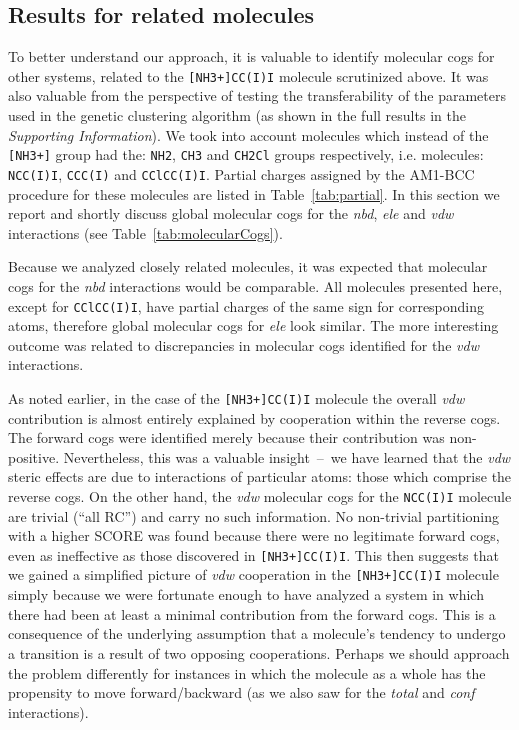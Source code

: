 {\color{black}
\subsection*{Results for related molecules}
To better understand our approach, it is valuable to identify molecular cogs for other systems, related to the \texttt{[NH3+]CC(I)I} molecule scrutinized above.
It was also valuable from the perspective of testing the transferability of the parameters used in the genetic clustering algorithm (as shown in the full results in the \emph{Supporting Information}).
We took into account molecules which instead of the \texttt{[NH3+]} group had the: \texttt{NH2}, \texttt{CH3} and \texttt{CH2Cl} groups respectively, i.e. molecules: \texttt{NCC(I)I}, \texttt{CCC(I)} and \texttt{CClCC(I)I}. 
Partial charges assigned by the AM1-BCC procedure for these molecules are listed in Table~\ref{tab:partial}. 
In this section we report and shortly discuss global molecular cogs for the \emph{nbd}, \emph{ele} and \emph{vdw} interactions (see Table~\ref{tab:molecularCogs}).

Because we analyzed closely related molecules, it was expected that molecular cogs for the \emph{nbd} interactions would be comparable.
All molecules presented here, except for \texttt{CClCC(I)I}, have partial charges of the same sign for corresponding atoms, therefore global molecular cogs for \emph{ele} look similar.
The more interesting outcome was related to discrepancies in molecular cogs identified for the \emph{vdw} interactions.

As noted earlier, in the case of the \texttt{[NH3+]CC(I)I} molecule the overall \emph{vdw} contribution is almost entirely explained by cooperation within the reverse cogs.
The forward cogs were identified merely because their contribution was non-positive.
Nevertheless, this was a valuable insight~--~we have learned that the \emph{vdw} steric effects are due to interactions of particular atoms: those which comprise the reverse cogs.
On the other hand, the \emph{vdw} molecular cogs for the \texttt{NCC(I)I} molecule are trivial (``all RC'') and carry no such information.
No non-trivial partitioning with a higher SCORE was found because there were no legitimate forward cogs, even as ineffective as those discovered in \texttt{[NH3+]CC(I)I}.
This then suggests that we gained a simplified picture of \emph{vdw} cooperation in the \texttt{[NH3+]CC(I)I} molecule simply because we were fortunate enough to have analyzed a system in which there had been at least a minimal contribution from the forward cogs.
This is a consequence of the underlying assumption that a molecule's tendency to undergo a transition is a result of two opposing cooperations.
Perhaps we should approach the problem differently for instances in which the molecule as a whole has the propensity to move forward/backward (as we also saw for the \emph{total} and \emph{conf} interactions).

}
